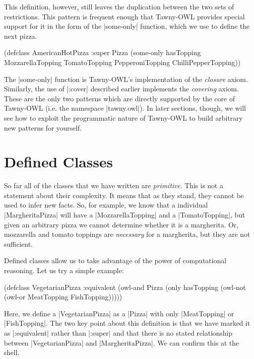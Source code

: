 This definition, however, still leaves the duplication between the two sets of
restrictions. This pattern is frequent enough that Tawny-OWL provides special
support for it in the form of the |some-only| function, which we use to define
the next pizza.

\begin{tawny}
(defclass AmericanHotPizza
  :super
  Pizza
  (some-only hasTopping MozzarellaTopping TomatoTopping
             PepperoniTopping ChilliPepperTopping))
\end{tawny}

The |some-only| function is Tawny-OWL's implementation of the \emph{closure} axiom.
Similarly, the use of |:cover| described earlier implements the \emph{covering}
axiom. These are the only two patterns which are directly supported by the
core of Tawny-OWL (i.e. the namespace |tawny.owl|). In later sections, though,
we will see how to exploit the programmatic nature of Tawny-OWL to build
arbitrary new patterns for yourself.

\section{Defined Classes}
\label{defined}

So far all of the classes that we have written are
\emph{primitive}. This is not a statement about their complexity. It
means that as they stand, they cannot be used to infer new facts. So,
for example, we know that a individual |MargheritaPizza| will have a
|MozzarellaTopping| and a |TomatoTopping|, but given an arbitrary
pizza we cannot determine whether it is a margherita. Or, mozzarella
and tomato toppings are \emph{necessary} for a margherita, but they
are not sufficient.

Defined classes allow us to take advantage of the power of computational
reasoning. Let us try a simple example:

\begin{tawny}
(defclass VegetarianPizza
  :equivalent
  (owl-and Pizza
           (only hasTopping
                 (owl-not (owl-or MeatTopping FishTopping)))))
\end{tawny}

Here, we define a |VegetarianPizza| as a |Pizza| with only
|MeatTopping| or |FishTopping|. The two key point about this
definition is that we have marked it as |:equivalent| rather than |:super| and
that there is no stated relationship between |VegetarianPizza| and
|MargheritaPizza|. We can confirm this at the shell. 


